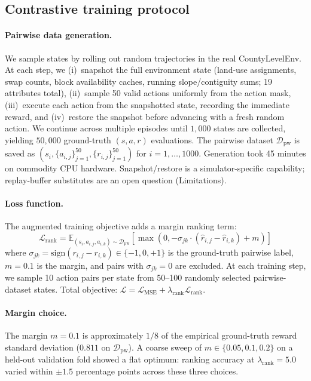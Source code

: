 \documentclass[11pt]{article}
\begin{document}
\subsection{Contrastive training protocol}\label{sec:methods-contrastive}

\paragraph{Pairwise data generation.} We sample states by rolling out random trajectories in the real CountyLevelEnv. At each step, we (i)~snapshot the full environment state (land-use assignments, swap counts, block availability caches, running slope/contiguity sums; 19 attributes total), (ii)~sample 50 valid actions uniformly from the action mask, (iii)~execute each action from the snapshotted state, recording the immediate reward, and (iv)~restore the snapshot before advancing with a fresh random action. We continue across multiple episodes until $1{,}000$ states are collected, yielding $50{,}000$ ground-truth $(s, a, r)$ evaluations. The pairwise dataset $\mathcal{D}_{\text{pw}}$ is saved as $(s_i, \{a_{i,j}\}_{j=1}^{50}, \{r_{i,j}\}_{j=1}^{50})$ for $i = 1, \ldots, 1000$. Generation took 45 minutes on commodity CPU hardware. Snapshot/restore is a simulator-specific capability; replay-buffer substitutes are an open question (Limitations).

\paragraph{Loss function.} The augmented training objective adds a margin ranking term:
\begin{equation*}
\mathcal{L}_{\text{rank}} = \mathbb{E}_{(s_i, a_{i,j}, a_{i,k}) \sim \mathcal{D}_{\text{pw}}} \left[ \max\left(0, -\sigma_{jk} \cdot (\hat{r}_{i,j} - \hat{r}_{i,k}) + m\right) \right]
\end{equation*}
where $\sigma_{jk} = \text{sign}(r_{i,j} - r_{i,k}) \in \{-1, 0, +1\}$ is the ground-truth pairwise label, $m = 0.1$ is the margin, and pairs with $\sigma_{jk} = 0$ are excluded. At each training step, we sample 10 action pairs per state from 50--100 randomly selected pairwise-dataset states. Total objective: $\mathcal{L} = \mathcal{L}_{\text{MSE}} + \lambda_{\text{rank}} \mathcal{L}_{\text{rank}}$.

\paragraph{Margin choice.} The margin $m = 0.1$ is approximately $1/8$ of the empirical ground-truth reward standard deviation ($0.811$ on $\mathcal{D}_{\text{pw}}$). A coarse sweep of $m \in \{0.05, 0.1, 0.2\}$ on a held-out validation fold showed a flat optimum: ranking accuracy at $\lambda_{\text{rank}}{=}5.0$ varied within $\pm 1.5$ percentage points across these three choices.
\end{document}
